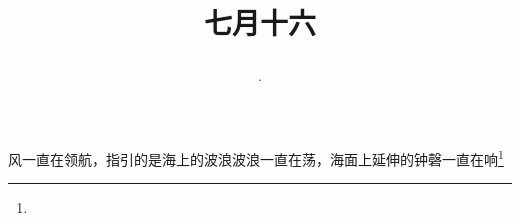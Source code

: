 \title{\date[d=19,m=8,y=2024][year:cn-y,年,month:cn,day:cn,日,·,weekday]·七月十六 }
风一直在领航，指引的是海上的波浪波浪一直在荡，海面上延伸的钟磬一直在响\footnote{ }

